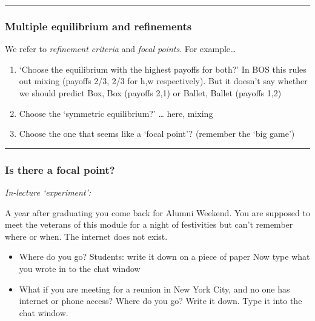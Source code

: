 \documentclass[]{article}
\begin{document}
\begin{center}\rule{0.5\linewidth}{\linethickness}\end{center}

\hypertarget{multiple-equilibrium-and-refinements}{%
\subsubsection{Multiple equilibrium and refinements}\label{multiple-equilibrium-and-refinements}}

We refer to \emph{refinement criteria} and \emph{focal points}. For example\ldots{}

\begin{enumerate}
\def\labelenumi{\arabic{enumi}.}
\item
  `Choose the equilibrium with the highest payoffs for both?' In BOS this rules out mixing (payoffs 2/3, 2/3 for h,w respectively).
  But it doesn't say whether we should predict Box, Box (payoffs 2,1) or Ballet, Ballet (payoffs 1,2)
\item
  Choose the `symmetric equilibrium?' \ldots{} here, mixing
\item
  Choose the one that seems like a `focal point'? (remember the `big game')
\end{enumerate}

\begin{center}\rule{0.5\linewidth}{\linethickness}\end{center}

\hypertarget{is-there-a-focal-point}{%
\subsubsection{Is there a focal point?}\label{is-there-a-focal-point}}

\emph{In-lecture `experiment':}

A year after graduating you come back for Alumni Weekend. You are supposed to meet the veterans of this module for a night of festivities but can't remember where or when. The internet does not exist.

\begin{itemize}
\item
  Where do you go? Students: write it down on a piece of paper Now type what you wrote in to the chat window
\item
  What if you are meeting for a reunion in New York City, and no one has internet or phone access? Where do you go? Write it down. Type it into the chat window.
\end{itemize}
\end{document}
